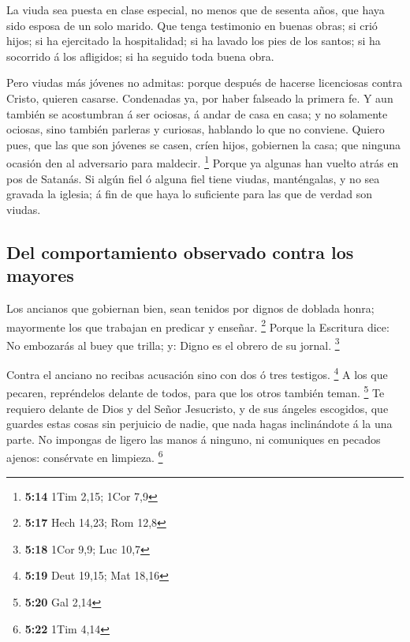 La viuda sea puesta en clase especial, no menos que de
sesenta años, que haya sido esposa de un solo marido. 
Que tenga testimonio en buenas obras; si crió hijos; si ha ejercitado la
hospitalidad; si ha lavado los pies de los santos; si ha socorrido á los
afligidos; si ha seguido toda buena obra.

 Pero viudas más jóvenes no admitas: porque después de
hacerse licenciosas contra Cristo, quieren casarse. 
Condenadas ya, por haber falseado la primera fe.  Y aun
también se acostumbran á ser ociosas, á andar de casa en casa; y no
solamente ociosas, sino también parleras y curiosas, hablando lo que no
conviene.  Quiero pues, que las que son jóvenes se casen,
críen hijos, gobiernen la casa; que ninguna ocasión den al adversario
para maldecir. \footnote{\textbf{5:14} 1Tim 2,15; 1Cor 7,9}
 Porque ya algunas han vuelto atrás en pos de Satanás.
 Si algún fiel ó alguna fiel tiene viudas, manténgalas, y
no sea gravada la iglesia; á fin de que haya lo suficiente para las que
de verdad son viudas.

\hypertarget{del-comportamiento-observado-contra-los-mayores}{%
\subsection{Del comportamiento observado contra los
mayores}\label{del-comportamiento-observado-contra-los-mayores}}

 Los ancianos que gobiernan bien, sean tenidos por dignos
de doblada honra; mayormente los que trabajan en predicar y enseñar.
\footnote{\textbf{5:17} Hech 14,23; Rom 12,8}  Porque la
Escritura dice: No embozarás al buey que trilla; y: Digno es el obrero
de su jornal. \footnote{\textbf{5:18} 1Cor 9,9; Luc 10,7}

 Contra el anciano no recibas acusación sino con dos ó
tres testigos. \footnote{\textbf{5:19} Deut 19,15; Mat 18,16}
 A los que pecaren, repréndelos delante de todos, para
que los otros también teman. \footnote{\textbf{5:20} Gal 2,14}
 Te requiero delante de Dios y del Señor Jesucristo, y de
sus ángeles escogidos, que guardes estas cosas sin perjuicio de nadie,
que nada hagas inclinándote á la una parte.  No impongas
de ligero las manos á ninguno, ni comuniques en pecados ajenos:
consérvate en limpieza. \footnote{\textbf{5:22} 1Tim 4,14}

